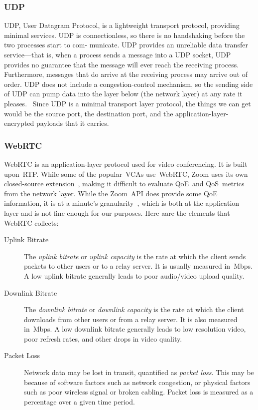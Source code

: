         \subsubsection{UDP}\label{introduction:qos:udp}
            UDP, User Datagram Protocol, is a lightweight transport protocol, providing minimal services. UDP is connectionless, so there is no handshaking before the two processes start to com- municate. UDP provides an unreliable data transfer service—that is, when a process sends a message into a UDP socket, UDP provides no guarantee that the message will ever reach the receiving process. Furthermore, messages that do arrive at the receiving process may arrive out of order. UDP does not include a congestion-control mechanism, so the sending side of UDP can pump data into the layer below (the network layer) at any rate it pleases.~\autocite{alma990025667610203776} Since UDP is a minimal transport layer protocol, the things we can get would be the source port, the destination port, and the application-layer-encrypted payloads that it carries.


        \subsubsection{WebRTC}\label{introduction:qos:webrtc}
            WebRTC is an application-layer protocol used for video conferencing. It is built upon~RTP. While some of the popular~VCAs use~WebRTC, Zoom uses its own closed-source extension~\autocite{marczak2020}, making it difficult to evaluate QoE~and QoS~metrics from the network layer. While the Zoom~API does provide some QoE information, it is at a minute's granularity~\autocite{walia2019}, which is both at the application layer and is not fine enough for our purposes. Here aare the elements that WebRTC collects:

            \begin{description}
                \item[Uplink Bitrate] The \emph{uplink bitrate} or \emph{uplink capacity} is the rate at which the client sends packets to other users or to a relay server. It is usually measured in~Mbps. A low uplink bitrate generally leads to poor audio/video upload quality.

                \item[Downlink Bitrate] The \emph{downlink bitrate} or \emph{downlink capacity} is the rate at which the client downloads from other users or from a relay server. It is also measured in~Mbps. A low downlink bitrate generally leads to low resolution video, poor refresh rates, and other drops in video quality.

                \item[Packet Loss] Network data may be lost in transit, quantified as \emph{packet loss}. This may be because of software factors such as network congestion, or physical factors such as poor wireless signal or broken cabling. Packet loss is measured as a percentage over a given time period.
            \end{description}
        

